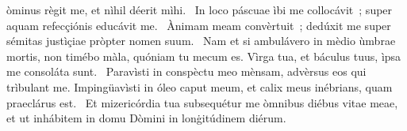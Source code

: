 \psalmChapterWithInscription{}
{ }
{%
òminus règit me, et nìhil déerit mìhi. 
~In loco páscuae ìbi me collocávit~; super aquam refecçiónis educávit me. 
~Ànimam meam convèrtuit~; dedúxit me super sémitas justìçiae pròpter nomen suum. 
~Nam et si ambulávero in mèdio ùmbrae mortis, non timébo màla, quóniam tu mecum es. Vìrga tua, et báculus tuus, ìpsa me consoláta sunt. 
~Paravìsti in conspèctu meo mènsam, advèrsus eos qui trìbulant me. Impingüavìsti in óleo caput meum, et calix meus inébrians, quam praeclárus est. 
~Et mizericórdia tua subsequétur me òmnibus diébus vitae meae, et ut inhábitem in domu Dòmini in lonġitúdinem diérum. 
}
